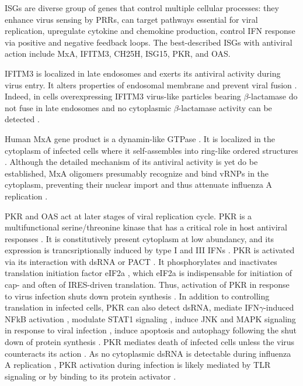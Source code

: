 		\glspl{ISG} are diverse group of genes that control multiple cellular processes: they enhance virus sensing by \gls{PRR}s, can target pathways essential for viral replication, upregulate cytokine and chemokine production, control \gls{IFN} response via positive and negative feedback loops. The best-described \gls{ISG}s with antiviral action include \gls{MxA}, \gls{IFITM3}, \gls{CH25H}, \gls{ISG15}, \gls{PKR}, and \gls{OAS}. 
		
		\gls{IFITM3} is localized in late endosomes and exerts its antiviral activity during virus entry. It alters properties of endosomal membrane and prevent viral fusion \parencite{Desai2014}. Indeed, in cells overexpressing \gls{IFITM3} virus-like particles bearing $\beta$-lactamase do not fuse in late endosomes and no cytoplasmic $\beta$-lactamase activity can be detected \parencite{Desai2014}.
		
		Human \gls{MxA} gene product is a dynamin-like \gls{GTPase} \parencite{Nakayama1992}. It is localized in the cytoplasm of infected cells where it self-assembles into ring-like ordered structures \parencite{Gao2010}. Although the detailed mechanism of its antiviral activity is yet do be established, \gls{MxA} oligomers presumably recognize and bind \gls{vRNP}s in the cytoplasm, preventing their nuclear import and thus attenuate influenza A replication \parencite{Haller2010}.
		
		\gls{PKR} and \gls{OAS} act at later stages of viral replication cycle. \gls{PKR} is a multifunctional serine/threonine kinase that has a critical role in host antiviral responses \parencite{Garcia2006a}. It is constitutively present cytoplasm at low abundancy, and its expression is trancsriptionally induced by type I and III \gls{IFN}s \parencite{Meurs1990}. \gls{PKR} is activated via its interaction with dsRNA or \gls{PACT} \parencite{Li2006a}. It phosphorylates and inactivates translation initiation factor \gls{eIF2a} \parencite{Levin1978}, which \gls{eIF2a} is indispensable for initiation of cap- and often of \gls{IRES}-driven translation. Thus, activation of \gls{PKR} in response to virus infection shuts down protein synthesis \parencite{Kimball1999}. In addition to controlling translation in infected cells, \gls{PKR} can also detect dsRNA, mediate \gls{IFN}$\gamma$-induced \gls{NFkB} activation \parencite{Deb2001}, modulate \gls{STAT}1 signaling \parencite{Wong1997}, induce \gls{JNK} and \gls{MAPK} signaling in response to viral infection \parencite{Chu1999}, induce apoptosis and autophagy following the shut down of protein synthesis \parencite{Gil2000, Talloczy2002}. \gls{PKR} mediates death of infected cells unless the virus counteracts its action \parencite{Takizawa1996, Hatada1999}. As no cytoplasmic dsRNA is  detectable during influenza A replication \parencite{Wisskirchen2011}, \gls{PKR} activation during infection is likely mediated by \gls{TLR} signaling \parencite{Jiang2003} or by binding to its protein activator \parencite{Garcia2006a}.
		
